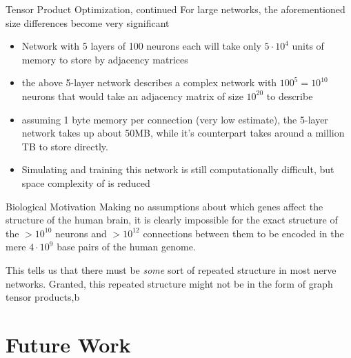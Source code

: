 \documentclass[leqno,presentation,unknownkeysallowed]{beamer}
\begin{document}
\begin{frame}{Tensor Product Optimization, continued}
For large networks, the aforementioned size differences become very significant
\begin{itemize}
    \item Network with 5 layers of 100 neurons each will take only $5 \cdot 10^4$ units of memory to store by adjacency matrices
    \item the above 5-layer network describes a complex network with $100^{5}=10^{10}$ neurons that would take an adjacency matrix of size $10^{20}$ to describe
    \item assuming 1 byte memory per connection (very low estimate), the 5-layer network takes up about 50MB, while it's counterpart takes around a million TB to store directly. 
    \item Simulating and training this network is still computationally difficult, but space complexity  of is reduced
\end{itemize}
\end{frame}

\begin{frame}{Biological Motivation}
Making no assumptions about which genes affect the structure of the human brain, it is clearly impossible for the exact structure of the $>10^{10}$ neurons and $>10^{12}$ connections between them to be encoded in the mere $4 \cdot 10^{9}$ base pairs of the human genome. 

This tells us that there must be \textit{some} sort of repeated structure in most nerve networks. Granted, this repeated structure might not be in the form of graph tensor products,b

\end{frame}

\section{Future Work}
\end{document}
